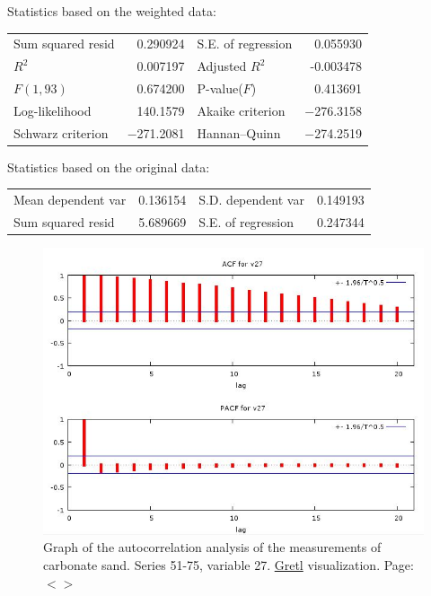\documentclass[11pt]{article}
\begin{document}
\begin{appendices}
\begin{table}[H]
\begin{center}
	\vspace{1em}Statistics based on the weighted data:

	\vspace{1ex}
	\begin{tabular}{lrlr}
		Sum squared resid &  0.290924 & S.E. of regression &  0.055930 \\
		$R^2$ &  0.007197 & Adjusted $R^2$ & -0.003478 \\
		$F(1, 93)$ &  0.674200 & P-value($F$) &  0.413691 \\
		Log-likelihood &  140.1579 & Akaike criterion & $-$276.3158 \\
		Schwarz criterion & $-$271.2081 & Hannan--Quinn & $-$274.2519 \\
	\end{tabular}

	\vspace{1em}Statistics based on the original data:

	\vspace{1ex}
	\begin{tabular}{lrlr}
		Mean dependent var &  0.136154 & S.D. dependent var &  0.149193 \\
		Sum squared resid &  5.689669 & S.E. of regression &  0.247344 \\
	\end{tabular}
	\label{tab:27}
	\end{center}
\end{table}

\begin{figure}[H]
	\begin{center}
	\includegraphics[scale=0.4]{G-autocorr-sand51-75.jpg}
	\caption{Graph of the autocorrelation analysis of the measurements of carbonate sand. Series 51-75, variable 27. \href{http://gretl.sourceforge.net/}{Gretl} visualization. Page: $<$\pageref{page-41}$>$­}
	\label{fig:A.29}
	\end{center}
\end{figure}


\end{appendices}
\end{document}
